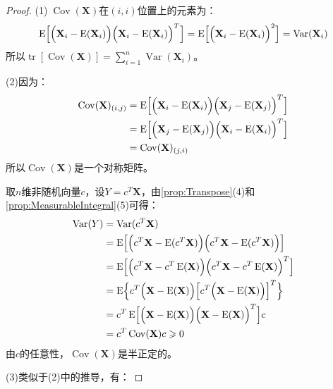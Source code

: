\begin{proof}
	(1)$\;\operatorname{Cov}(\mathbf{X})$在$(i,i)$位置上的元素为：
	\begin{equation*}
		\operatorname{E}\Bigl[\Bigl(\mathbf{X}_i-\operatorname{E}(\mathbf{X}_i)\Bigr)\Bigl(\mathbf{X}_i-\operatorname{E}(\mathbf{X}_i)\Bigr)^T\Bigr]=\operatorname{E}\Bigl[\Bigl(\mathbf{X}_i-\operatorname{E}(\mathbf{X}_i)\Bigr)^2\Bigr]=\operatorname{Var}(\mathbf{X}_i)
	\end{equation*}
	所以$\operatorname{tr}[\operatorname{Cov}(\mathbf{X})]=\sum\limits_{i=1}^{n}\operatorname{Var}(\mathbf{X}_i)$。\par
	(2)因为：
	\begin{align*}
		\operatorname{Cov}(\mathbf{X})_{(i,j)}
		&=\operatorname{E}\Bigl[\Bigl(\mathbf{X}_i-\operatorname{E}(\mathbf{X}_i)\Bigr)\Bigl(\mathbf{X}_j-\operatorname{E}(\mathbf{X}_j)\Bigr)^T\Bigr] \\
		&=\operatorname{E}\Bigl[\Bigl(\mathbf{X}_j-\operatorname{E}(\mathbf{X}_j)\Bigr)\Bigl(\mathbf{X}_i-\operatorname{E}(\mathbf{X}_i)\Bigr)^T\Bigr] \\
		&=\operatorname{Cov}(\mathbf{X})_{(j,i)}
	\end{align*}
	所以$\operatorname{Cov}(\mathbf{X})$是一个对称矩阵。\par
	取$n$维非随机向量$c$，设$Y=c^T\mathbf{X}$，由\cref{prop:Transpose}(4)和\cref{prop:MeasurableIntegral}(5)可得：
	\begin{align*}
		\operatorname{Var}(Y)
		&=\operatorname{Var}(c^T\mathbf{X}) \\
		&=\operatorname{E}\Bigl[\Bigl(c^T\mathbf{X}-\operatorname{E}(c^T\mathbf{X})\Bigr)\Bigl(c^T\mathbf{X}-\operatorname{E}(c^T\mathbf{X})\Bigr)\Bigr] \\
		&=\operatorname{E}\Bigl[\Bigl(c^T\mathbf{X}-c^T\operatorname{E}(\mathbf{X})\Bigr)\Bigl(c^T\mathbf{X}-c^T\operatorname{E}(\mathbf{X})\Bigr)^T\Bigr] \\
		&=\operatorname{E}\Bigl\{c^T\Bigl(\mathbf{X}-\operatorname{E}(\mathbf{X})\Bigr)\Bigl[c^T\Bigl(\mathbf{X}-\operatorname{E}(\mathbf{X})\Bigr)\Bigr]^T\Bigr\} \\
		&=c^T\operatorname{E}\Bigl[\Bigl(\mathbf{X}-\operatorname{E}(\mathbf{X})\Bigr)\Bigl(\mathbf{X}-\operatorname{E}(\mathbf{X})\Bigr)^T\Bigr]c \\
		&=c^T\operatorname{Cov}(\mathbf{X})c\geqslant0
	\end{align*}
	由$c$的任意性，$\operatorname{Cov}(\mathbf{X})$是半正定的。\par
	(3)类似于(2)中的推导，有：

\end{proof}
